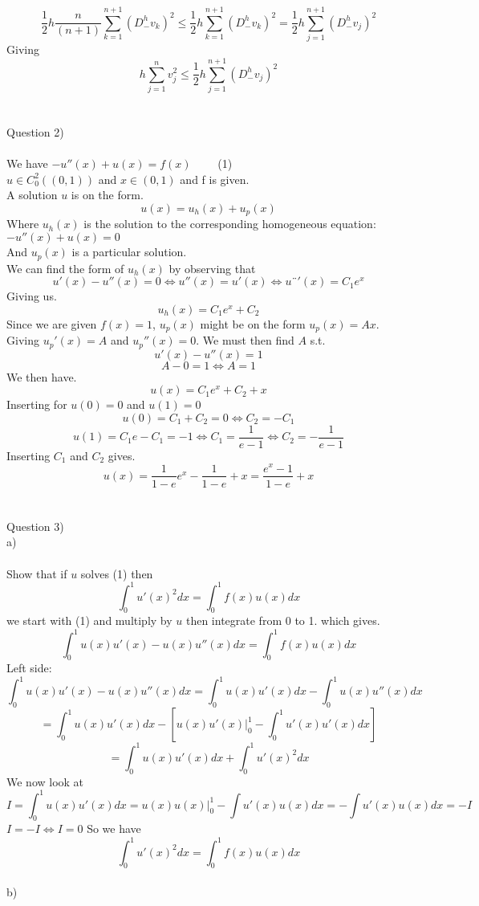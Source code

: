 \documentclass[12pt, letterpaper, twoside]{article}
\begin{document}
$$
\frac{1}{2} h \frac{n}{(n+1)} \sum_{k=1}^{n+1} (D_-^h v_k)^2 
\leq
\frac{1}{2} h  \sum_{k=1}^{n+1} (D_-^h v_k)^2 
=
\frac{1}{2} h  \sum_{j=1}^{n+1} (D_-^h v_j)^2 
$$
Giving
$$
h\sum_{j=1}^n v_j^2 \leq \frac{1}{2} h \sum_{j=1}^{n+1} (D_-^h v_j)^2
$$
\ \\
\ \\
Question 2)\\
\ \\
We have $-u''(x) + u(x) = f(x)$ \ \ \ \ (1) \\
$u \in C_0^2((0,1))$ and $x \in (0,1)$ and f is given.
\ \\
A solution $u$ is on the form.
$$
u(x) = u_h(x) + u_p(x) 
$$
Where $u_h(x)$ is the solution to the corresponding homogeneous equation:
$-u''(x) + u(x) = 0$\\
And $u_p(x)$ is a particular solution.\\
We can find the form of $u_h(x)$ by observing that
$$
u'(x) - u''(x) = 0 \iff u''(x) = u'(x) \iff u¨'(x) = C_1 e^x 
$$
Giving us.
$$
u_h(x) = C_1e^x + C_2
$$
Since we are given $f(x)=1$, $u_p(x)$ might be on the form $u_p(x) = Ax$.\\
Giving $u_p'(x) = A$ and $u_p''(x) = 0$. We must then find $A$ s.t.
$$
u'(x) - u''(x) = 1
$$
$$
A - 0 = 1 \iff A=1
$$
We then have.
$$
u(x) = C_1e^x + C_2 + x 
$$
Inserting for $u(0)= 0$ and $u(1)=0$
$$
u(0) = C_1 + C_2 = 0 \iff C_2 = -C_1
$$
$$
u(1) = C_1e - C_1 = -1 \iff C_1 = \frac{1}{e-1} \iff C_2 = -\frac{1}{e-1}
$$
Inserting $C_1$ and $C_2$ gives.
$$
u(x) = \frac{1}{1-e}e^x - \frac{1}{1-e} + x 
=
\frac{e^x - 1}{1 - e} + x
$$
\ \\
\ \\
Question 3)\\
a)\\
\ \\
Show that if $u$ solves (1) then
$$
\int_0^1 u'(x)^2 dx = \int_0^1 f(x)u(x) dx
$$
we start with (1) and multiply by $u$ then integrate from 0 to 1. which gives.
$$
\int_0^1 u(x)u'(x) - u(x)u''(x) dx = \int_0^1 f(x)u(x) dx
$$
Left side:
$$
\int_0^1 u(x)u'(x) - u(x)u''(x) dx
=
\int_0^1 u(x)u'(x) dx - \int_0^1 u(x)u''(x) dx
$$
$$
=
\int_0^1 u(x)u'(x) dx - \left[ u(x)u'(x)|_0^1 - \int_0^1 u'(x)u'(x) dx \right]
$$
$$
=
\int_0^1 u(x)u'(x) dx + \int_0^1 u'(x)^2 dx 
$$
We now look at
$$
I = \int_0^1 u(x)u'(x) dx = u(x)u(x)|_0^1 - \int u'(x)u(x) dx = - \int u'(x)u(x) dx = -I
$$
$I = -I \iff I = 0$
So we have
$$
\int_0^1 u'(x)^2 dx = \int_0^1 f(x)u(x) dx
$$
\newpage
\ \\
b)\\
\ \\
\end{document}
